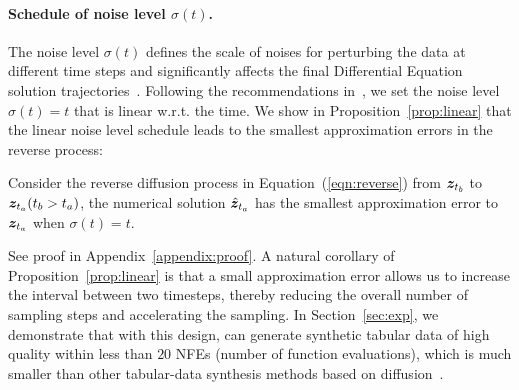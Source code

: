 \paragraph{Schedule of noise level $\sigma(t)$.} The noise level $\sigma(t)$ defines the scale of noises for perturbing the data at different time steps and significantly affects the final Differential Equation solution trajectories~\citep{vp, edm}. Following the recommendations in~\citet{edm}, we set the noise level $\sigma(t) = t$ that is linear w.r.t. the time. We show in Proposition~\ref{prop:linear} that the linear noise level schedule leads to the smallest approximation errors in the reverse process:
\begin{proposition}\label{prop:linear}
    Consider the reverse diffusion process in Equation~(\ref{eqn:reverse}) from ${\bm{z}}_{t_b}$ to ${\bm{z}}_{t_a} (t_b > t_a)$, the numerical solution $\hat{{\bm{z}}}_{t_a}$ has the smallest approximation error to ${\bm{z}}_{t_a}$ when $\sigma(t) = t$.
\end{proposition}
See proof in Appendix~\ref{appendix:proof}. A natural corollary of Proposition~\ref{prop:linear} is that a small approximation error allows us to increase the interval between two timesteps, thereby reducing the overall number of sampling steps and accelerating the sampling. In Section~\ref{sec:exp}, we demonstrate that with this design, \modelname can generate synthetic tabular data of high quality within less than $20$ NFEs (number of function evaluations), which is much smaller than other tabular-data synthesis methods based on diffusion~\citep{stasy, tabddpm}.
